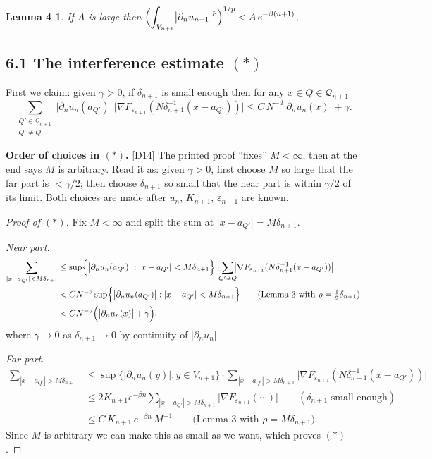 \documentclass[11pt,reqno]{amsart}
\theoremstyle{plain}
\newtheorem*{lemD}{Lemma 4}
\theoremstyle{definition}
\theoremstyle{plain}
\theoremstyle{definition}
\theoremstyle{remark}
\newcommand{\nd}{\partial_n}
\newcommand{\Ledger}[1]{{\scriptsize\textsf{[#1]}}}
\begin{document}
\begin{lemD}
If $A$ is large then
$\displaystyle\Bigl(\int_{V_{n+1}}\bigl|\nd u_{n+1}\bigr|^p\Bigr)^{1/p}
 <A\,e^{-\beta(n+1)}$.
\end{lemD}

\subsection*{6.1 The interference estimate $(*)$}

\noindent First we claim: given $\gamma>0$, if $\delta_{n+1}$ is small enough then
for any $x\in Q\in\mathcal Q_{n+1}$
\begin{equation}\label{eq:star2}\tag{$*$}
 \sum_{\substack{Q'\in\mathcal Q_{n+1}\\Q'\ne Q}}
  \bigl|\nd u_n(a_{Q'})\bigr|\,
  \bigl|\nabla F_{\varepsilon_{n+1}}(N\delta_{n+1}^{-1}(x-a_{Q'}))\bigr|
 \le C\,N^{-d}\bigl|\nd u_n(x)\bigr|+\gamma .
\end{equation}

\begin{filled}
\textbf{Order of choices in $(*)$.} \Ledger{D14} The printed proof ``fixes''
$M<\infty$, then at the end says $M$ is arbitrary. Read it as: given $\gamma>0$,
first choose $M$ so large that the far part is $<\gamma/2$; then choose
$\delta_{n+1}$ so small that the near part is within $\gamma/2$ of its limit. Both
choices are made after $u_n$, $K_{n+1}$, $\varepsilon_{n+1}$ are known.
\end{filled}

\begin{proof}[Proof of $(*)$]
Fix $M<\infty$ and split the sum at $|x-a_{Q'}|=M\delta_{n+1}$.

\emph{Near part.}
\begin{align*}
 \sum_{|x-a_{Q'}|<M\delta_{n+1}}
 &\le\sup\Bigl\{\bigl|\nd u_n(a_{Q'})\bigr|:|x-a_{Q'}|<M\delta_{n+1}\Bigr\}
   \cdot\!\!\sum_{Q'\ne Q}\!\!
   \bigl|\nabla F_{\varepsilon_{n+1}}(N\delta_{n+1}^{-1}(x-a_{Q'}))\bigr|\\
 &<CN^{-d}\sup\Bigl\{\bigl|\nd u_n(a_{Q'})\bigr|:|x-a_{Q'}|<M\delta_{n+1}\Bigr\}
 \qquad\text{(Lemma 3 with }\rho=\tfrac12\delta_{n+1})\\
 &<CN^{-d}\Bigl(\bigl|\nd u_n(x)\bigr|+\gamma\Bigr),
\end{align*}
where $\gamma\to0$ as $\delta_{n+1}\to0$ by continuity of $|\nd u_n|$.

\emph{Far part.}
\begin{align*}
 \sum_{|x-a_{Q'}|>M\delta_{n+1}}
 &\le\sup\bigl\{|\nd u_n(y)|:y\in V_{n+1}\bigr\}\cdot\!\!
   \sum_{|x-a_{Q'}|>M\delta_{n+1}}\!\!
   \bigl|\nabla F_{\varepsilon_{n+1}}(N\delta_{n+1}^{-1}(x-a_{Q'}))\bigr|\\
 &\le2K_{n+1}e^{-\beta n}\!\!\sum_{|x-a_{Q'}|>M\delta_{n+1}}\!\!
   \bigl|\nabla F_{\varepsilon_{n+1}}(\cdots)\bigr|
 \qquad(\delta_{n+1}\text{ small enough})\\
 &\le C\,K_{n+1}\,e^{-\beta n}\,M^{-1}
 \qquad\text{(Lemma 3 with }\rho=M\delta_{n+1}).
\end{align*}
Since $M$ is arbitrary we can make this as small as we want, which proves $(*)$.
\end{proof}
\end{document}
